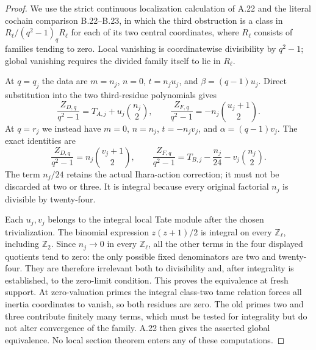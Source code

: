 \begin{proof}
We use the strict continuous localization calculation of A.22 and
the literal cochain comparison B.22--B.23, in
which the third obstruction is a class in
$R_\ell/(q^2-1)_qR_\ell$ for each of its two central coordinates,
where $R_\ell$ consists of families tending to zero. Local vanishing
is coordinatewise divisibility by $q^2-1$; global vanishing requires
the divided family itself to lie in $R_\ell$.

At $q=q_j$ the data are
$m=n_j$, $n=0$, $t=n_ju_j$, and $\beta=(q-1)u_j$.
Direct substitution into the two third-residue polynomials gives
\[
\frac{Z_{D,q}}{q^2-1}
 =T_{A,j}+u_j\binom{n_j}{2},\qquad
\frac{Z_{F,q}}{q^2-1}
 =-n_j\binom{u_j+1}{2}.
\]
At $q=r_j$ we instead have $m=0$, $n=n_j$, $t=-n_jv_j$,
and $\alpha=(q-1)v_j$. The exact identities are
\[
\frac{Z_{D,q}}{q^2-1}
 =n_j\binom{v_j+1}{2},\qquad
\frac{Z_{F,q}}{q^2-1}
 =T_{B,j}-\frac{n_j}{24}-v_j\binom{n_j}{2}.
\]
The term $n_j/24$ retains the actual Ihara-action correction; it
must not be discarded at two or three. It is integral because every
original factorial $n_j$ is divisible by twenty-four.

Each $u_j,v_j$ belongs to the integral local Tate module after the
chosen trivialization. The binomial expression $z(z+1)/2$ is integral
on every $\mathbb Z_\ell$, including $\mathbb Z_2$. Since
$n_j\to0$ in every $\mathbb Z_\ell$, all the other terms in the
four displayed quotients tend to zero: the only possible fixed
denominators are two and twenty-four. They are therefore irrelevant
both to divisibility and, after integrality is established, to the
zero-limit condition. This proves the equivalence at fresh support.
At zero-valuation primes the integral class-two tame relation forces
all inertia coordinates to vanish, so both residues are zero. The
old primes two and three contribute finitely many terms, which must
be tested for integrality but do not alter convergence of the family.
A.22 then gives the asserted global equivalence. No local section
theorem enters any of these computations.
\end{proof}

